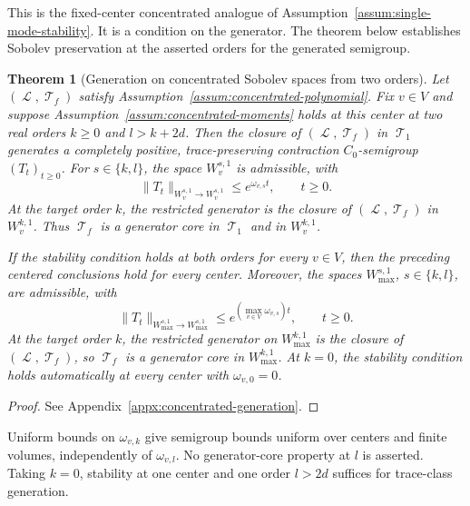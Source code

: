 \documentclass[11pt]{article}
\theoremstyle{myplain}
\newtheorem{thm}{Theorem}[section]
\theoremstyle{mydefinition}
\theoremstyle{remark}
\DeclareMathOperator{\cL}{\mathcal{L}}
\DeclareMathOperator{\cT}{\mathcal{T}}
\DeclareMathOperator{\1}{\mathds{1}}
\begin{document}
        This is the fixed-center concentrated analogue of Assumption~\ref{assum:single-mode-stability}. It is a condition on the generator. The theorem below establishes Sobolev preservation at the asserted orders for the generated semigroup.

        \begin{thm}[Generation on concentrated Sobolev spaces from two orders]\label{thm:concentrated-generation} 
            Let $(\cL,\cT_f)$ satisfy Assumption~\ref{assum:concentrated-polynomial}. Fix $v\in V$ and suppose Assumption~\ref{assum:concentrated-moments} holds at this center at two real orders $k\geq0$ and $l>k+2d$. Then the closure of $(\cL,\cT_f)$ in $\cT_1$ generates a completely positive, trace-preserving contraction $C_0$-semigroup $(T_t)_{t\geq0}$. For $s\in\{k,l\}$, the space $W_v^{s,1}$ is admissible, with
            \begin{equation}\label{eq:concentrated-generation-bound}
                \|T_t\|_{W_v^{s,1}\to W_v^{s,1}}
                \leq e^{\omega_{v,s}t},
                \qquad t\geq0.
            \end{equation}
            At the target order $k$, the restricted generator is the closure of $(\cL,\cT_f)$ in $W_v^{k,1}$. Thus $\cT_f$ is a generator core in $\cT_1$ and in $W_v^{k,1}$.

            If the stability condition holds at both orders for every $v\in V$, then the preceding centered conclusions hold for every center. Moreover, the spaces $W_{\max}^{s,1}$, $s\in\{k,l\}$, are admissible, with
            \begin{equation}\label{eq:concentrated-max-generation-bound}
                \|T_t\|_{W_{\max}^{s,1}\to W_{\max}^{s,1}}
                \leq e^{(\max_{v\in V}\omega_{v,s})t},\qquad t\geq0.
            \end{equation}
            At the target order $k$, the restricted generator on $W_{\max}^{k,1}$ is the closure of $(\cL,\cT_f)$, so $\cT_f$ is a generator core in $W_{\max}^{k,1}$. At $k=0$, the stability condition holds automatically at every center with $\omega_{v,0}=0$.
        \end{thm}

        \begin{proof}
            See Appendix~\ref{appx:concentrated-generation}.
        \end{proof}

        Uniform bounds on $\omega_{v,k}$ give semigroup bounds uniform over centers and finite volumes, independently of $\omega_{v,l}$. No generator-core property at $l$ is asserted. Taking $k = 0$, stability at one center and one order $l > 2d$ suffices for trace-class generation.
\end{document}
